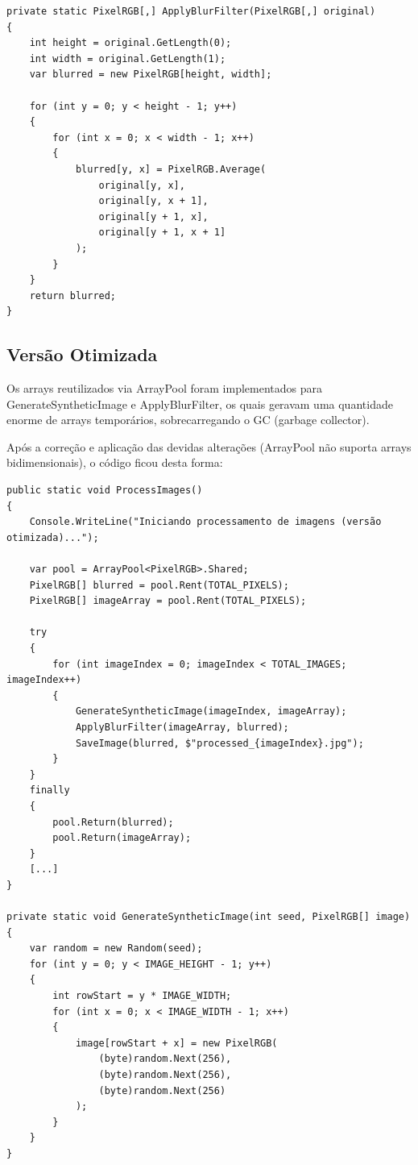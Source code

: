 \documentclass[
	12pt,				%
	oneside,			%
	a4paper,			%
	english,			%
	brazil,				%
	]{abntex2}
\begin{document}
{\begin{lstlisting}
private static PixelRGB[,] ApplyBlurFilter(PixelRGB[,] original)
{
    int height = original.GetLength(0);
    int width = original.GetLength(1);
    var blurred = new PixelRGB[height, width];
    
    for (int y = 0; y < height - 1; y++)
    {
        for (int x = 0; x < width - 1; x++)
        {
            blurred[y, x] = PixelRGB.Average(
                original[y, x],
                original[y, x + 1],
                original[y + 1, x],
                original[y + 1, x + 1]
            );
        }
    }
    return blurred;
}
\end{lstlisting}

\subsection{Versão Otimizada}
Os arrays reutilizados via ArrayPool foram implementados para GenerateSyntheticImage e ApplyBlurFilter, os quais geravam uma quantidade enorme de arrays temporários, sobrecarregando o GC (garbage collector).

Após a correção e aplicação das devidas alterações (ArrayPool não suporta arrays bidimensionais), o código ficou desta forma:

\begin{lstlisting}
public static void ProcessImages()
{
    Console.WriteLine("Iniciando processamento de imagens (versão otimizada)...");

    var pool = ArrayPool<PixelRGB>.Shared;
    PixelRGB[] blurred = pool.Rent(TOTAL_PIXELS);
    PixelRGB[] imageArray = pool.Rent(TOTAL_PIXELS);

    try
    {
        for (int imageIndex = 0; imageIndex < TOTAL_IMAGES; imageIndex++)
        {
            GenerateSyntheticImage(imageIndex, imageArray);
            ApplyBlurFilter(imageArray, blurred);
            SaveImage(blurred, $"processed_{imageIndex}.jpg");
        }
    }
    finally
    {
        pool.Return(blurred);
        pool.Return(imageArray);
    }
    [...]
}

private static void GenerateSyntheticImage(int seed, PixelRGB[] image)
{
    var random = new Random(seed);
    for (int y = 0; y < IMAGE_HEIGHT - 1; y++)
    {
        int rowStart = y * IMAGE_WIDTH;
        for (int x = 0; x < IMAGE_WIDTH - 1; x++)
        {
            image[rowStart + x] = new PixelRGB(
                (byte)random.Next(256),
                (byte)random.Next(256),
                (byte)random.Next(256)
            );
        }
    }
}


\end{lstlisting}}
\end{document}
